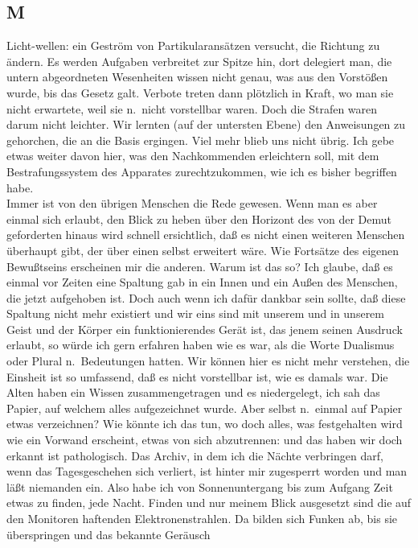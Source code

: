 \documentclass[
]{article}
\author{}
\date{\vspace{-2.5em}}
\begin{document}
\subsection{M}\label{m}

Licht-wellen: ein Geström von Partikularansätzen versucht, die Richtung
zu ändern. Es werden Aufgaben verbreitet zur Spitze hin, dort delegiert
man, die untern abgeordneten Wesenheiten wissen nicht genau, was aus den
Vorstößen wurde, bis das Gesetz galt. Verbote treten dann plötzlich in
Kraft, wo man sie nicht erwartete, weil sie n.~nicht vorstellbar waren.
Doch die Strafen waren darum nicht leichter. Wir lernten (auf der
untersten Ebene) den Anweisungen zu gehorchen, die an die Basis
ergingen. Viel mehr blieb uns nicht übrig. Ich gebe etwas weiter davon
hier, was den Nachkommenden erleichtern soll, mit dem Bestrafungssystem
des Apparates zurechtzukommen, wie ich es bisher begriffen habe.\\
Immer ist von den übrigen Menschen die Rede gewesen. Wenn man es aber
einmal sich erlaubt, den Blick zu heben über den Horizont des von der
Demut geforderten hinaus wird schnell ersichtlich, daß es nicht einen
weiteren Menschen überhaupt gibt, der über einen selbst erweitert wäre.
Wie Fortsätze des eigenen Bewußtseins erscheinen mir die anderen. Warum
ist das so? Ich glaube, daß es einmal vor Zeiten eine Spaltung gab in
ein Innen und ein Außen des Menschen, die jetzt aufgehoben ist. Doch
auch wenn ich dafür dankbar sein sollte, daß diese Spaltung nicht mehr
existiert und wir eins sind mit unserem und in unserem Geist und der
Körper ein funktionierendes Gerät ist, das jenem seinen Ausdruck
erlaubt, so würde ich gern erfahren haben wie es war, als die Worte
Dualismus oder Plural n.~Bedeutungen hatten. Wir können hier es nicht
mehr verstehen, die Einsheit ist so umfassend, daß es nicht vorstellbar
ist, wie es damals war. Die Alten haben ein Wissen zusammengetragen und
es niedergelegt, ich sah das Papier, auf welchem alles aufgezeichnet
wurde. Aber selbst n.~einmal auf Papier etwas verzeichnen? Wie könnte
ich das tun, wo doch alles, was festgehalten wird wie ein Vorwand
erscheint, etwas von sich abzutrennen: und das haben wir doch erkannt
ist pathologisch. Das Archiv, in dem ich die Nächte verbringen darf,
wenn das Tagesgeschehen sich verliert, ist hinter mir zugesperrt worden
und man läßt niemanden ein. Also habe ich von Sonnenuntergang bis zum
Aufgang Zeit etwas zu finden, jede Nacht. Finden und nur meinem Blick
ausgesetzt sind die auf den Monitoren haftenden Elektronenstrahlen. Da
bilden sich Funken ab, bis sie überspringen und das bekannte Geräusch
\end{document}
